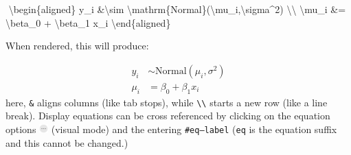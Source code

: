\documentclass[
  letterpaper,
  DIV=11,
  numbers=noendperiod]{scrartcl}
\newenvironment{Shaded}{\begin{snugshade}}{\end{snugshade}}
\newcommand{\ExtensionTok}[1]{\textcolor[rgb]{0.00,0.23,0.31}{#1}}
\newcommand{\KeywordTok}[1]{\textcolor[rgb]{0.00,0.23,0.31}{#1}}
\newcommand{\NormalTok}[1]{\textcolor[rgb]{0.00,0.23,0.31}{#1}}
\newcommand{\SpecialCharTok}[1]{\textcolor[rgb]{0.37,0.37,0.37}{#1}}
\newcommand{\SpecialStringTok}[1]{\textcolor[rgb]{0.13,0.47,0.30}{#1}}
\begin{document}
\begin{Shaded}
\begin{Highlighting}[]
\SpecialStringTok{$$}
\KeywordTok{\textbackslash{}begin}\NormalTok{\{}\ExtensionTok{aligned}\NormalTok{\}}
\SpecialStringTok{y\_i \&}\SpecialCharTok{\textbackslash{}sim}\SpecialStringTok{ }\SpecialCharTok{\textbackslash{}mathrm}\SpecialStringTok{\{Normal\}(}\SpecialCharTok{\textbackslash{}mu}\SpecialStringTok{\_i,}\SpecialCharTok{\textbackslash{}sigma}\SpecialStringTok{\^{}2) }\SpecialCharTok{\textbackslash{}\textbackslash{}}
\SpecialCharTok{\textbackslash{}mu}\SpecialStringTok{\_i \&= }\SpecialCharTok{\textbackslash{}beta}\SpecialStringTok{\_0 + }\SpecialCharTok{\textbackslash{}beta}\SpecialStringTok{\_1 x\_i}
\KeywordTok{\textbackslash{}end}\NormalTok{\{}\ExtensionTok{aligned}\NormalTok{\}}
\SpecialStringTok{$$}
\end{Highlighting}
\end{Shaded}

When rendered, this will produce:

\[
\begin{aligned}
y_i &\sim \mathrm{Normal}(\mu_i,\sigma^2) \\
\mu_i &= \beta_0 + \beta_1 x_i
\end{aligned}
\] here, \texttt{\&} aligns columns (like tab stops), while
\texttt{\textbackslash{}\textbackslash{}} starts a new row (like a line
break). Display equations can be cross referenced by clicking on the
equation options
\includegraphics[width=0.13542in,height=\textheight]{images/threedots.png}
(visual mode) and the entering \texttt{\#eq–label} (\texttt{eq} is the
equation suffix and this cannot be changed.)
\end{document}
